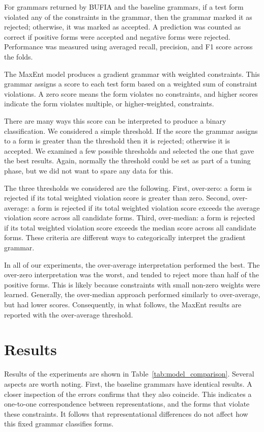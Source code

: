 \documentclass[11pt]{article}
\begin{document}
For grammars returned by BUFIA and the baseline grammars,
if a test form violated any of the constraints in the grammar,
then the grammar marked it as rejected; otherwise, it was marked as accepted.
A prediction was counted as correct if positive forms were accepted
and negative forms were rejected.
Performance was measured using averaged recall, precision,
and F1 score across the folds.

The MaxEnt model produces a gradient grammar with weighted constraints.
This grammar assigns a score to each test form
based on a weighted sum of constraint violations.
A zero score means the form violates no constraints, and higher scores
indicate the form violates multiple, or higher-weighted, constraints.

There are many ways this score can be interpreted to produce a binary
classification.
We considered a simple threshold.
If the score the grammar assigns to a form is greater than the threshold then
it is rejected;
otherwise it is accepted.
We examined a few possible thresholds and selected the one that gave the best
results.
Again, normally the threshold could be set as part of a tuning phase,
but we did not want to spare any data for this.

The three thresholds we considered are the following.
First, over-zero: a form is rejected if its total weighted violation score is
greater than zero.
Second, over-average: a form is rejected if its total weighted violation score
exceeds the average violation score across all candidate forms.
Third, over-median: a form is rejected if its total weighted violation score
exceeds the median score across all candidate forms.
These criteria are different ways to categorically interpret the gradient grammar.

In all of our experiments, the over-average interpretation 
performed the best.
The over-zero interpretation was the worst, and tended to reject more than half
of the positive forms.
This is likely because constraints with small non-zero weights were learned.
Generally, the over-median approach performed similarly to over-average, but
had lower scores.
Consequently, in what follows, the MaxEnt results are reported with the
over-average threshold.

\section{Results}

Results of the experiments are shown in Table~\ref{tab:model_comparison}.
Several aspects are worth noting.
First, the baseline grammars have identical results.
A closer inspection of the errors confirms that they also coincide.
This indicates a one-to-one correspondence between representations,
and the forms that violate these constraints.
It follows that representational differences do not affect
how this fixed grammar classifies forms.
\end{document}
